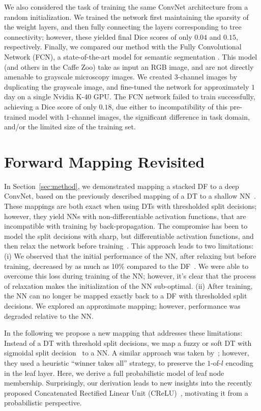 \documentclass[twocolumn]{svjour3}
\begin{document}
We also considered the task of training the same ConvNet architecture from a random initialization.
We trained the network first maintaining the sparsity of the weight layers, and then fully connecting the layers corresponding to tree connectivity; however, these yielded final Dice scores of only $0.04$ and $0.15$, respectively.
Finally, we compared our method with the Fully Convolutional Network (FCN), a state-of-the-art model for semantic segmentation \cite{long_shelhamer_fcn_2015}.
This model (and others in the Caffe Zoo) take as input an RGB image, and are not directly amenable to grayscale microscopy images. We created 3-channel images by duplicating the grayscale image, and fine-tuned the network for approximately $1$ day on a single Nvidia K-40 GPU.
The FCN network failed to train successfully, achieving a Dice score of only $0.18$, due either to incompatibility of this pre-trained model with 1-channel images, the significant difference in task domain, and/or the limited size of the training set.


\section{Forward Mapping Revisited}
\label{sec:newmapping}

In Section~\ref{sec:method}, we demonstrated mapping a stacked DF to a deep ConvNet, based on the previously described mapping of a DT to a shallow NN~\cite{Sethi1990}.
These mappings are both exact when using DTs with thresholded split decisions; however, they yield NNs with non-differenti\-able activation functions, that are incompatible with training by back-propagation.
The compromise has been to model the split decisions with sharp, but differentiable activation functions, and then relax the network before training~\cite{Welbl14}.
This approach leads to two limitations:
(i) We observed that the initial performance of the NN, after relaxing but before training, decreased by as much as 10\% compared to the DF~\cite{Richmond:tc}.  We were able to overcome this loss during training of the NN; however, it's clear that the process of relaxation makes the initialization of the NN sub-optimal.
(ii) After training, the NN can no longer be mapped exactly back to a DF with thresholded split decisions.  We explored an approximate mapping; however, performance was degraded relative to the NN.

In the following we propose a new mapping that addresses these limitations: Instead of a DT with threshold split decisions, we map a fuzzy or soft DT with sigmoidal split decision~\cite{SuarezL99} to a NN.
A similar approach was taken by~\cite{Sethi:1995dt}; however, they used a heuristic ``winner takes all'' strategy, to preserve the $1$-of-$l$ encoding in the leaf layer.  Here, we derive a full probabilistic model of leaf node membership.
Surprisingly, our derivation leads to new insights into the recently proposed Concatenated Rectified Linear Unit (CReLU)~\cite{Shang:2016tj}, motivating it from a probabilistic perspective.
\end{document}
